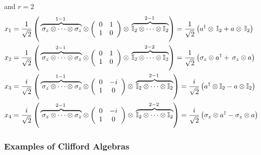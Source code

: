 \documentclass[aps,preprint]{revtex4}%
\begin{document}
and $r=2$%
\begin{align}
x_{1}  &  =\frac{1}{\sqrt{2}}\left(
\overset{1-1}{\,\overbrace{\,\mathbb{\sigma}_{z}\otimes\cdots\otimes
\mathbb{\sigma}_{z}}}\otimes\left(
\begin{array}
[c]{cc}%
0 & 1\\
1 & 0
\end{array}
\right)  \otimes\overset{2-1}{\,\overbrace{\mathbb{I}_{2}\otimes\cdots
\otimes\mathbb{I}_{2}}}\right)  =\frac{1}{\sqrt{2}}\left(  a^{\dagger}%
\otimes\,\mathbb{I}_{2}+a\otimes\,\mathbb{I}_{2}\right) \nonumber\\
x_{2}  &  =\frac{1}{\sqrt{2}}\left(
\overset{2-1}{\,\overbrace{\,\mathbb{\sigma}_{z}\otimes\cdots\otimes
\mathbb{\sigma}_{z}}}\otimes\left(
\begin{array}
[c]{cc}%
0 & 1\\
1 & 0
\end{array}
\right)  \otimes\overset{2-2}{\,\overbrace{\mathbb{I}_{2}\otimes\cdots
\otimes\mathbb{I}_{2}}}\right)  =\frac{1}{\sqrt{2}}\left(  \mathbb{\sigma}%
_{z}\otimes a^{\dagger}+\,\mathbb{\sigma}_{z}\otimes a\right) \nonumber\\
x_{3}  &  =\frac{i}{\sqrt{2}}\left(
\overset{1-1}{\,\overbrace{\,\mathbb{\sigma}_{z}\otimes\cdots\otimes
\mathbb{\sigma}_{z}}}\otimes\left(
\begin{array}
[c]{cc}%
0 & -i\\
1 & 0
\end{array}
\right)  \otimes\overset{2-1}{\,\overbrace{\mathbb{I}_{2}\otimes\cdots
\otimes\mathbb{I}_{2}}}\right)  =\frac{i}{\sqrt{2}}\left(  a^{\dagger}%
\otimes\mathbb{I}_{2}-a\otimes\mathbb{I}_{2}\right) \nonumber\\
x_{4}  &  =\frac{i}{\sqrt{2}}\left(
\overset{2-1}{\,\overbrace{\,\mathbb{\sigma}_{z}\otimes\cdots\otimes
\mathbb{\sigma}_{z}}}\otimes\left(
\begin{array}
[c]{cc}%
0 & -i\\
1 & 0
\end{array}
\right)  \otimes\overset{2-2}{\,\overbrace{\mathbb{I}_{2}\otimes\cdots
\otimes\mathbb{I}_{2}}}\right)  =\frac{i}{\sqrt{2}}\left(  \mathbb{\sigma}%
_{z}\otimes a^{\dagger}-\mathbb{\sigma}_{z}\otimes a\right)
\end{align}


\subsubsection{Examples of Clifford Algebras}
\end{document}
